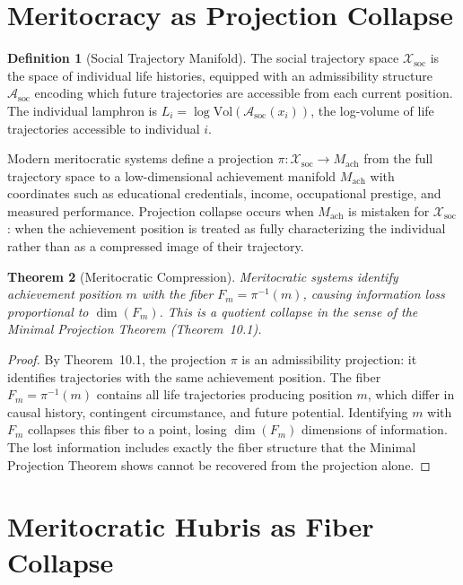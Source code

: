 \documentclass[12pt, oneside]{book}
\theoremstyle{flyxion}
\newtheorem{theorem}{Theorem}[chapter]
\theoremstyle{definition}
\newtheorem{definition}[theorem]{Definition}
\begin{document}
\section{Meritocracy as Projection Collapse}

\begin{definition}[Social Trajectory Manifold]
The social trajectory space $\mathcal{X}_\mathrm{soc}$
is the space of individual life histories, equipped
with an admissibility structure $\mathcal{A}_\mathrm{soc}$
encoding which future trajectories are accessible from
each current position. The individual lamphron is
$L_i = \log\mathrm{Vol}(\mathcal{A}_\mathrm{soc}(x_i))$,
the log-volume of life trajectories accessible to
individual $i$.
\end{definition}

Modern meritocratic systems define a projection $\pi :
\mathcal{X}_\mathrm{soc} \to M_\mathrm{ach}$ from
the full trajectory space to a low-dimensional
achievement manifold $M_\mathrm{ach}$ with coordinates
such as educational credentials, income, occupational
prestige, and measured performance. Projection collapse
occurs when $M_\mathrm{ach}$ is mistaken for
$\mathcal{X}_\mathrm{soc}$: when the achievement
position is treated as fully characterizing the
individual rather than as a compressed image of their
trajectory.

\begin{theorem}[Meritocratic Compression]
\label{thm:meritocratic}
Meritocratic systems identify achievement position
$m$ with the fiber $F_m = \pi^{-1}(m)$, causing
information loss proportional to $\dim(F_m)$. This
is a quotient collapse in the sense of the Minimal
Projection Theorem (Theorem~10.1).
\end{theorem}

\begin{proof}
By Theorem~10.1, the projection $\pi$ is an
admissibility projection: it identifies trajectories
with the same achievement position. The fiber
$F_m = \pi^{-1}(m)$ contains all life trajectories
producing position $m$, which differ in causal
history, contingent circumstance, and future
potential. Identifying $m$ with $F_m$ collapses
this fiber to a point, losing $\dim(F_m)$ dimensions
of information. The lost information includes exactly
the fiber structure that the Minimal Projection Theorem
shows cannot be recovered from the projection alone.
\end{proof}

\section{Meritocratic Hubris as Fiber Collapse}
\end{document}

